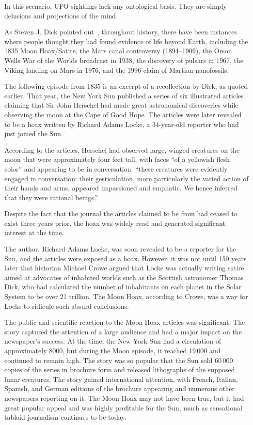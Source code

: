 In this scenario, UFO sightings lack any ontological basis. They are simply delusions and projections of the mind.

As Steven J. Dick pointed out~\cite[Chapter~3]{Dick2015}, throughout history, there have been instances where people thought they had found evidence of life beyond Earth, including the 1835 Moon Hoax/Satire, the Mars canal controversy (1894--1909), the Orson Wells War of the Worlds broadcast in 1938, the discovery of pulsars in 1967, the Viking landing on Mars in 1976, and the 1996 claim of Martian nanofossils.

The following episode from 1835 is an excerpt of a recollection by Dick, as quoted earlier. That year, the New York Sun published a series of six illustrated articles claiming that Sir John Herschel had made great astronomical discoveries while observing the moon at the Cape of Good Hope. The articles were later revealed to be a hoax written by Richard Adams Locke, a 34-year-old reporter who had just joined the Sun.

According to the articles, Herschel had observed large, winged creatures on the moon that were approximately four feet tall, with faces ``of a yellowish flesh color'' and appearing to be in conversation: ``these creatures were evidently engaged in conversation: their gesticulation, more particularly the varied action of their hands and arms, appeared impassioned and emphatic. We hence inferred that they were rational beings.''

Despite the fact that the journal the articles claimed to be from had ceased to exist three years prior, the hoax was widely read and generated significant interest at the time.

The author, Richard Adams Locke, was soon revealed to be a reporter for the Sun, and the articles were exposed as a hoax. However, it was not until 150 years later that historian Michael Crowe argued that Locke was actually writing satire aimed at advocates of inhabited worlds such as the Scottish astronomer Thomas Dick, who had calculated the number of inhabitants on each planet in the Solar System to be over 21 trillion. The Moon Hoax, according to Crowe, was a way for Locke to ridicule such absurd conclusions.

The public and scientific reaction to the Moon Hoax articles was significant. The story captured the attention of a large audience and had a major impact on the newspaper's success. At the time, the New York Sun had a circulation of approximately 8000, but during the Moon episode, it reached 19\,000 and continued to remain high. The story was so popular that the Sun sold 60\,000 copies of the series in brochure form and released lithographs of the supposed lunar creatures. The story gained international attention, with French, Italian, Spanish, and German editions of the brochure appearing and numerous other newspapers reporting on it. The Moon Hoax may not have been true, but it had great popular appeal and was highly profitable for the Sun, much as sensational tabloid journalism continues to be today.

